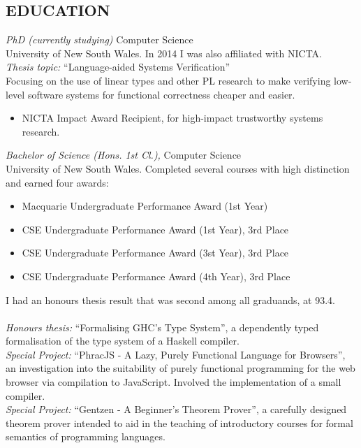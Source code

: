 \documentclass[line,margin]{res}
\begin{document}
\begin{resume}
\section{EDUCATION} 
                {\sl PhD (currently studying)} Computer Science\\
                University of New South Wales. In 2014 I was also affiliated
                with NICTA.
                \\ 
                \emph{Thesis topic:} ``Language-aided Systems Verification'' \\
                Focusing on the use of linear types and other PL research to
                make verifying low-level software systems for functional
                correctness cheaper and easier.
                \\
                \begin{itemize} \itemsep -2pt %
                    \item NICTA Impact Award Recipient, for high-impact trustworthy systems research.
                \end{itemize}

                {\sl Bachelor of Science (Hons. 1st Cl.),} Computer Science\\
                University of New South Wales. Completed several courses with high distinction
                and earned four awards:
                \begin{itemize} \itemsep -2pt %
                    \item Macquarie Undergraduate Performance Award (1st Year)
                    \item CSE Undergraduate Performance Award (1st Year), 3rd Place
                    \item CSE Undergraduate Performance Award (3st Year), 3rd Place
                    \item CSE Undergraduate Performance Award (4th Year), 3rd Place
                \end{itemize}
                I had an honours thesis result that was second among all graduands, at 93.4.
                \\
                \\ 
                \emph{Honours thesis:} ``Formalising GHC's Type System'', a dependently typed formalisation
                of the type system of a Haskell compiler.\\
                \emph{Special Project:} ``PhracJS - A Lazy, Purely Functional Language for Browsers'', an investigation into the suitability of purely functional programming for the web browser via compilation to JavaScript.
Involved the implementation of a small compiler.          \\
                \emph{Special Project:} ``Gentzen - A Beginner's Theorem Prover'', a carefully designed theorem prover intended to aid in the teaching of introductory courses for formal semantics of programming languages.
 

\end{resume}
\end{document}
